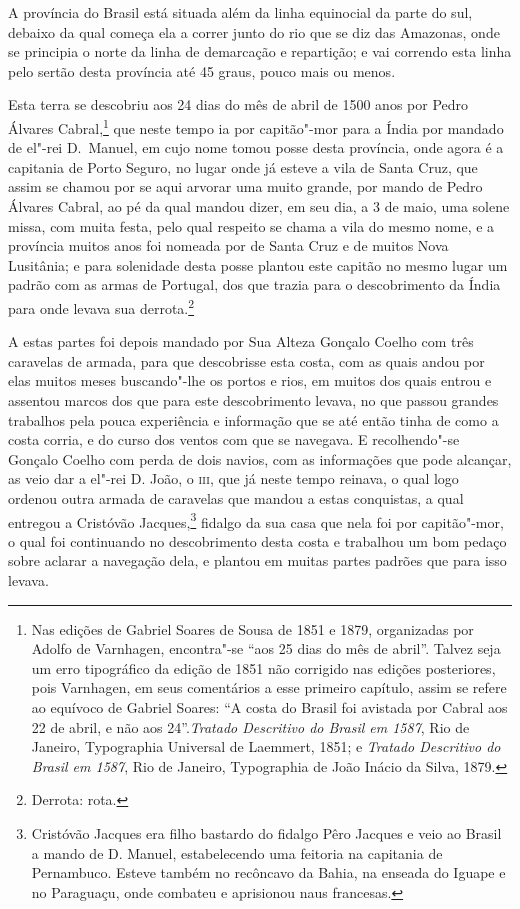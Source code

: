 A província do Brasil está situada além da linha equinocial da parte do sul, debaixo da
qual começa ela a correr junto do rio que se diz das Amazonas, onde se principia o norte
da linha de demarcação e repartição; e vai correndo esta linha pelo sertão desta província
até 45 graus, pouco mais ou menos.

Esta terra se descobriu aos 24 dias do mês de abril de 1500 anos por Pedro Álvares
Cabral,\footnote{ Nas edições de Gabriel Soares de Sousa de 1851 e 1879, organizadas por
Adolfo de Varnhagen, encontra"-se ``aos 25 dias do mês de abril''. Talvez seja um erro
tipográfico da edição de 1851 não corrigido nas edições posteriores, pois Varnhagen, em
seus comentários a esse primeiro capítulo, assim se refere ao equívoco de Gabriel Soares:
``A costa do Brasil foi avistada por Cabral aos 22 de abril, e não aos
24''.\textit{Tratado Descritivo do Brasil em 1587}, Rio de Janeiro, Typographia Universal
de Laemmert, 1851; e \textit{Tratado Descritivo do Brasil em 1587}, Rio de Janeiro,
Typographia de João Inácio da Silva, 1879.}
que neste tempo ia por capitão"-mor para a Índia por mandado de el"-rei D.~Manuel, em cujo
nome tomou posse desta província, onde agora é a capitania de Porto Seguro, no lugar onde
já esteve a vila de Santa Cruz, que assim se chamou por se aqui arvorar uma muito grande,
por mando de Pedro Álvares Cabral, ao pé da qual mandou dizer, em seu dia, a 3 de maio,
uma solene missa, com muita festa, pelo qual respeito se chama a vila do mesmo nome, e a
província muitos anos foi nomeada por de Santa Cruz e de muitos Nova Lusitânia; e para
solenidade desta posse plantou este capitão no mesmo lugar um padrão com as armas de
Portugal, dos que trazia para o descobrimento da Índia para onde levava sua derrota.\footnote{
Derrota: rota.}

A estas partes foi depois mandado por Sua Alteza Gonçalo Coelho com três caravelas de
armada, para que descobrisse esta costa, com as quais andou por elas muitos meses
buscando"-lhe os portos e rios, em muitos dos quais entrou e assentou marcos dos que para
este descobrimento levava, no que passou grandes trabalhos pela pouca experiência e
informação que se até então tinha de como a costa corria, e do curso dos ventos com que se
navegava. E recolhendo"-se Gonçalo Coelho com perda de dois navios, com as informações que
pode alcançar, as veio dar a el"-rei D. João, o \textsc{iii}, que já neste tempo reinava, o
qual logo ordenou outra armada de caravelas que mandou a estas conquistas, a qual entregou
a Cristóvão Jacques,\footnote{ Cristóvão Jacques era filho bastardo do fidalgo Pêro
Jacques e veio ao Brasil a mando de D. Manuel, estabelecendo uma feitoria na capitania de
Pernambuco. Esteve também no recôncavo da Bahia, na enseada do Iguape e no Paraguaçu, onde
combateu e aprisionou naus francesas.} fidalgo da sua casa que nela foi por capitão"-mor, o
qual foi continuando no descobrimento desta costa e trabalhou um bom pedaço sobre aclarar
a navegação dela, e plantou em muitas partes padrões que para isso levava.

